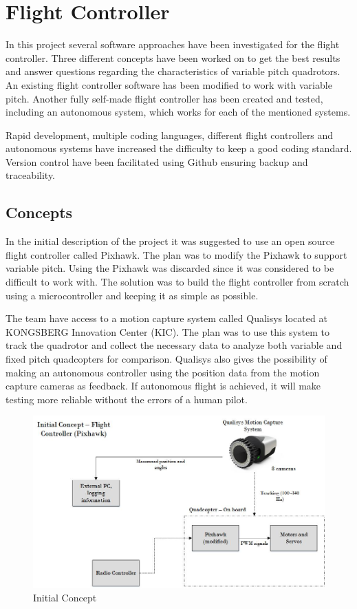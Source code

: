 \chapter{Flight Controller}

In this project several software approaches have been investigated for the flight controller. Three different concepts have been worked on to get the best results and answer questions regarding the characteristics of variable pitch quadrotors. An existing flight controller software has been modified to work with variable pitch. Another fully self-made flight controller has been created and tested, including an autonomous system, which works for each of the mentioned systems. \bigskip

Rapid development, multiple coding languages, different flight controllers and autonomous systems have increased the difficulty to keep a good coding standard. Version control have been facilitated using Github ensuring backup and traceability.

\section{Concepts}
In the initial description of the project it was suggested to use an open source flight controller called Pixhawk. The plan was to modify the Pixhawk to support variable pitch. Using the Pixhawk was discarded since it was considered to be difficult to work with. The solution was to build the flight controller from scratch using a microcontroller and keeping it as simple as possible.\bigskip

The team have access to a motion capture system called Qualisys located at KONGSBERG Innovation Center (KIC). The plan was to use this system to track the quadrotor and collect the necessary data to analyze both variable and fixed pitch quadcopters for comparison. Qualisys also gives the possibility of making an autonomous controller using the position data from the motion capture cameras as feedback. If autonomous flight is achieved, it will make testing more reliable without the errors of a human pilot.  \bigskip

\begin{figure}[H]
          \centering
            \includegraphics[scale = 0.45]{VAPIQ-PICTURES/Concept4.jpg}
                \caption{Initial Concept}
                \label{Con3}
            \label{dir}
\end{figure} 

